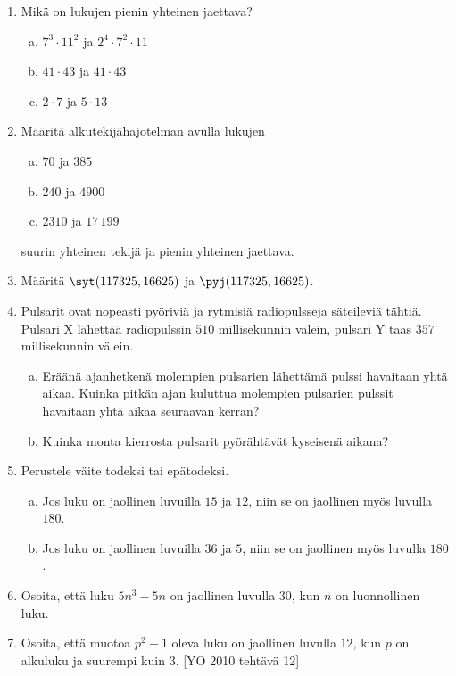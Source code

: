 \begin{enumerate}
\item Mikä on lukujen pienin yhteinen jaettava?
\begin{enumerate}[a)]
\item $7^3 \cdot 11^2$ ja $2^4 \cdot 7^2 \cdot 11$
\item $41 \cdot 43$ ja $41 \cdot 43$
\item $2 \cdot 7$ ja $5 \cdot 13$
\end{enumerate}

\item Määritä alkutekijähajotelman avulla lukujen
\begin{enumerate}[a)]
\item $70$ ja $385$
\item $240$ ja $4900$
\item $2310$ ja $17\, 199$
\end{enumerate}
suurin yhteinen tekijä ja pienin yhteinen jaettava.

\item
Määritä $\syt(117325,16625)$ ja $\pyj(117325,16625)$.

\item Pulsarit ovat nopeasti pyöriviä ja rytmisiä radiopulsseja
säteileviä tähtiä. Pulsari X lähettää radiopulssin $510$
millisekunnin välein, pulsari Y taas $357$ millisekunnin välein.

\begin{enumerate}[a)]
\item Eräänä ajanhetkenä molempien pulsarien lähettämä pulssi
havaitaan yhtä aikaa. Kuinka pitkän ajan kuluttua molempien
pulsarien pulssit havaitaan yhtä aikaa seuraavan kerran?
\item Kuinka monta kierrosta pulsarit pyörähtävät kyseisenä
aikana?
\end{enumerate}

\item Perustele väite todeksi tai epätodeksi.
\begin{enumerate}[a)]
\item Jos luku on jaollinen luvuilla $15$ ja $12$, niin se on
jaollinen myös luvulla $180$.
\item Jos luku on jaollinen luvuilla $36$ ja $5$, niin se on
jaollinen myös luvulla $180$.
\end{enumerate}

\item
Osoita, että luku $5n^3 - 5n$ on jaollinen luvulla $30$, kun $n$
on luonnollinen luku.

\item Osoita, että muotoa $p^2 - 1$ oleva luku on jaollinen
luvulla $12$, kun $p$ on alkuluku ja suurempi kuin $3$. [YO 2010
tehtävä 12]


\end{enumerate}
